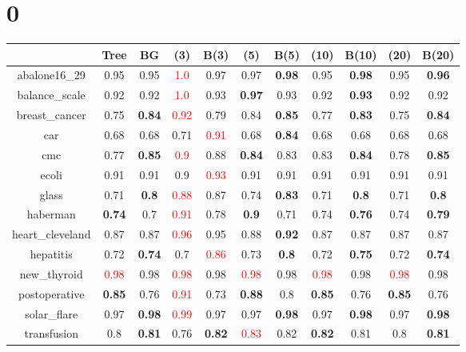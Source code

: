 \documentclass{article}%
\begin{document}
%
\normalsize%
\section*{0}%
\begin{tabular}{c|cccccccccc}%
\hline%
&Tree&BG&(3)&B(3)&(5)&B(5)&(10)&B(10)&(20)&B(20)\\%
\hline%
abalone16\_29&0.95&0.95&\textcolor{red}{ 
1.0
}&0.97&0.97&\textbf{0.98}&0.95&\textbf{0.98}&0.95&\textbf{0.96}\\%
\hline%
balance\_scale&0.92&0.92&\textcolor{red}{ 
1.0
}&0.93&\textbf{0.97}&0.93&0.92&\textbf{0.93}&0.92&0.92\\%
\hline%
breast\_cancer&0.75&\textbf{0.84}&\textcolor{red}{ 
0.92
}&0.79&0.84&\textbf{0.85}&0.77&\textbf{0.83}&0.75&\textbf{0.84}\\%
\hline%
car&0.68&0.68&0.71&\textcolor{red}{ 
0.91
}&0.68&\textbf{0.84}&0.68&0.68&0.68&0.68\\%
\hline%
cmc&0.77&\textbf{0.85}&\textcolor{red}{ 
0.9
}&0.88&\textbf{0.84}&0.83&0.83&\textbf{0.84}&0.78&\textbf{0.85}\\%
\hline%
ecoli&0.91&0.91&0.9&\textcolor{red}{ 
0.93
}&0.91&0.91&0.91&0.91&0.91&0.91\\%
\hline%
glass&0.71&\textbf{0.8}&\textcolor{red}{ 
0.88
}&0.87&0.74&\textbf{0.83}&0.71&\textbf{0.8}&0.71&\textbf{0.8}\\%
\hline%
haberman&\textbf{0.74}&0.7&\textcolor{red}{ 
0.91
}&0.78&\textbf{0.9}&0.71&0.74&\textbf{0.76}&0.74&\textbf{0.79}\\%
\hline%
heart\_cleveland&0.87&0.87&\textcolor{red}{ 
0.96
}&0.95&0.88&\textbf{0.92}&0.87&0.87&0.87&0.87\\%
\hline%
hepatitis&0.72&\textbf{0.74}&0.7&\textcolor{red}{ 
0.86
}&0.73&\textbf{0.8}&0.72&\textbf{0.75}&0.72&\textbf{0.74}\\%
\hline%
new\_thyroid&\textcolor{red}{ 
0.98
}&0.98&\textcolor{red}{ 
0.98
}&0.98&\textcolor{red}{ 
0.98
}&0.98&\textcolor{red}{ 
0.98
}&0.98&\textcolor{red}{ 
0.98
}&0.98\\%
\hline%
postoperative&\textbf{0.85}&0.76&\textcolor{red}{ 
0.91
}&0.73&\textbf{0.88}&0.8&\textbf{0.85}&0.76&\textbf{0.85}&0.76\\%
\hline%
solar\_flare&0.97&\textbf{0.98}&\textcolor{red}{ 
0.99
}&0.97&0.97&\textbf{0.98}&0.97&\textbf{0.98}&0.97&\textbf{0.98}\\%
\hline%
transfusion&0.8&\textbf{0.81}&0.76&\textbf{0.82}&\textcolor{red}{ 
0.83
}&0.82&\textbf{0.82}&0.81&0.8&\textbf{0.81}\\%

\end{tabular}
\end{document}
